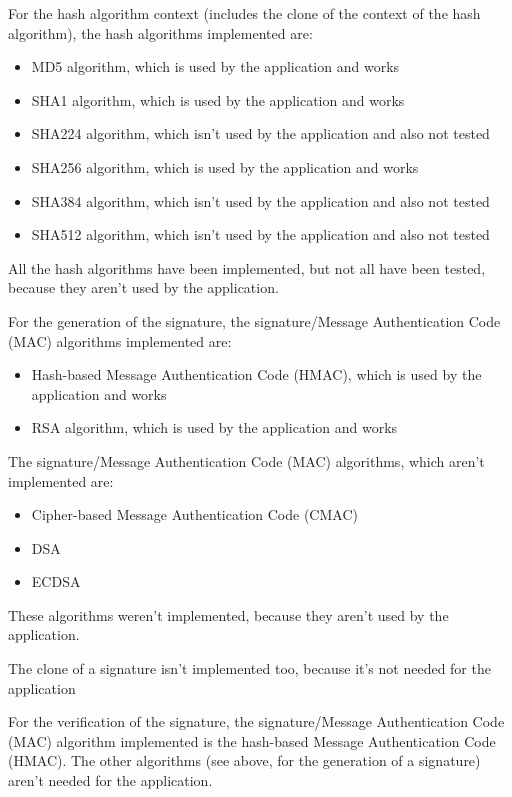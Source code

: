 For the hash algorithm context (includes the clone of the context of the hash
algorithm), the hash algorithms implemented are:
\begin{itemize}[noitemsep]
  \item MD5 algorithm, which is used by the \embtls application and works
  \item SHA1 algorithm, which is used by the \embtls application and works
  \item SHA224 algorithm, which isn't used by the \embtls application and also
  not tested
  \item SHA256 algorithm, which is used by the \embtls application and works
  \item SHA384 algorithm, which isn't used by the \embtls application and also
  not tested
  \item SHA512 algorithm, which isn't used by the \embtls application and also
  not tested
\end{itemize}

All the hash algorithms have been implemented, but not all have been tested,
because they aren't used by the \embtls application.

For the generation of the signature, the signature/Message Authentication Code
(MAC) algorithms implemented are:
\begin{itemize}[noitemsep]
  \item Hash-based Message Authentication Code (HMAC), which is used
  by the \embtls application and works
  \item RSA algorithm, which is used by the \embtls application and works
\end{itemize}

The signature/Message Authentication Code (MAC) algorithms, which aren't
implemented are:
\begin{itemize}[noitemsep]
  \item Cipher-based Message Authentication Code (CMAC)
  \item DSA
  \item ECDSA
\end{itemize}

These algorithms weren't implemented, because they aren't used by the \embtls
application.

The clone of a signature isn't implemented too, because it's not needed for the
\embtls application


For the verification of the signature, the signature/Message Authentication Code
(MAC) algorithm implemented is the hash-based Message Authentication Code
(HMAC).
The other algorithms (see above, for the generation of a signature) aren't
needed for the \embtls application.


